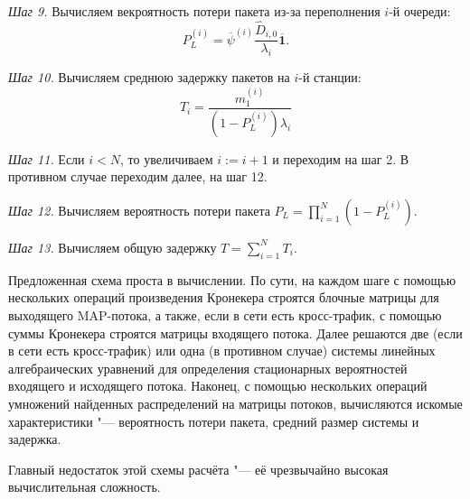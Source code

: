 \textit{Шаг 9.} Вычисляем векроятность потери пакета из-за переполнения $i$-й очереди:
$$
  P_L^{(i)} = \overline{\psi}^{(i)} \frac{\hat{D}_{i,0}}{\lambda_i} \overline{\mathbf{1}}.
$$

\textit{Шаг 10.} Вычисляем среднюю задержку пакетов на $i$-й станции:
$$
  T_i = \frac{m_1^{(i)}}{(1 - P_L^{(i)}) \lambda_i}
$$

\textit{Шаг 11.} Если $i < N$, то увеличиваем $i := i + 1$ и переходим на шаг 2. В противном случае переходим далее, на шаг 12.

\textit{Шаг 12.} Вычисляем вероятность потери пакета $P_L = \prod\limits_{i=1}^{N} (1 - P_L^{(i)})$.

\textit{Шаг 13.} Вычисляем общую задержку $T = \sum\limits_{i=1}^{N} T_i$.

Предложенная схема проста в вычислении. По сути, на каждом шаге с помощью нескольких операций произведения Кронекера строятся блочные матрицы для выходящего MAP-потока, а также, если в сети есть кросс-трафик, с помощью суммы Кронекера строятся матрицы входящего потока. Далее решаются две (если в сети есть кросс-трафик) или одна (в противном случае) системы линейных алгебраических уравнений для определения стационарных вероятностей входящего и исходящего потока. Наконец, с помощью нескольких операций умножений найденных распределений на матрицы потоков, вычисляются искомые характеристики "--- вероятность потери пакета, средний размер системы и задержка.

Главный недостаток этой схемы расчёта "--- её чрезвычайно высокая вычислительная сложность.

